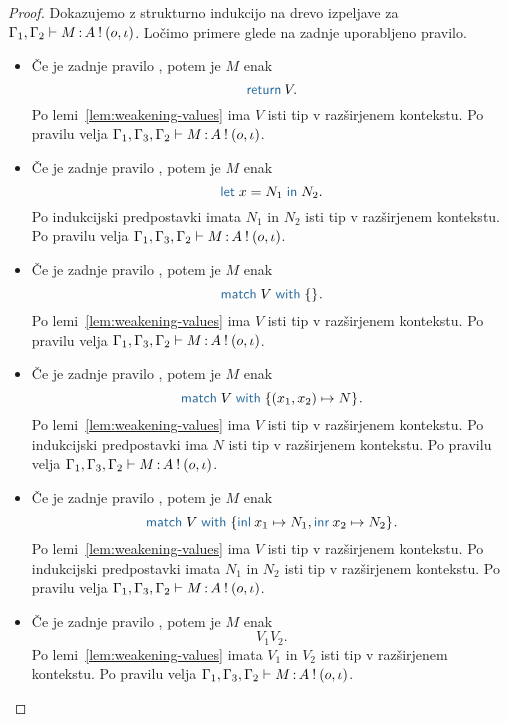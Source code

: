 \begin{proof}
	Dokazujemo z strukturno indukcijo na drevo izpeljave za $\Gamma_1, \Gamma_2 \vdash M \mathinner{:} A \mathbin{!} (o, \iota)$.
	Ločimo primere glede na zadnje uporabljeno pravilo.
	
	\begin{itemize}
		\item Če je zadnje pravilo , potem je $M$ enak $$\tmreturn{V}.$$
		Po lemi~\ref{lem:weakening-values} ima $V$ isti tip v razširjenem kontekstu.
		Po pravilu  velja $\Gamma_1, \Gamma_3, \Gamma_2 \vdash M \mathinner{:} A \mathbin{!} (o, \iota)$.
		
		\item Če je zadnje pravilo , potem je $M$ enak $$\tmlet{x}{N_1}{N_2}.$$
		Po indukcijski predpostavki imata $N_1$ in $N_2$ isti tip v razširjenem kontekstu.
		Po pravilu  velja $\Gamma_1, \Gamma_3, \Gamma_2 \vdash M \mathinner{:} A \mathbin{!} (o, \iota)$.
		
		\item Če je zadnje pravilo , potem je $M$ enak $$\tmmatch{V}{}.$$
		Po lemi~\ref{lem:weakening-values} ima $V$ isti tip v razširjenem kontekstu.
		Po pravilu  velja $\Gamma_1, \Gamma_3, \Gamma_2 \vdash M \mathinner{:} A \mathbin{!} (o, \iota)$.
		
		\item Če je zadnje pravilo , potem je $M$ enak $$\tmmatch{V}{(x_1,x_2) \mapsto N}.$$ 
		Po lemi~\ref{lem:weakening-values} ima $V$ isti tip v razširjenem kontekstu.
		Po indukcijski predpostavki ima $N$ isti tip v razširjenem kontekstu.
		Po pravilu  velja $\Gamma_1, \Gamma_3, \Gamma_2 \vdash M \mathinner{:} A \mathbin{!} (o, \iota)$.
		
		\item Če je zadnje pravilo , potem je $M$ enak $$\tmmatch{V}{\tminl{x_1} \mapsto N_1, \tminr{x_2} \mapsto N_2}.$$
		Po lemi~\ref{lem:weakening-values} ima $V$ isti tip v razširjenem kontekstu.
		Po indukcijski predpostavki imata $N_1$ in $N_2$ isti tip v razširjenem kontekstu.
		Po pravilu  velja $\Gamma_1, \Gamma_3, \Gamma_2 \vdash M \mathinner{:} A \mathbin{!} (o, \iota)$.
		
		\item Če je zadnje pravilo , potem je $M$ enak $$V_1 V_2.$$
		Po lemi~\ref{lem:weakening-values} imata $V_1$ in $V_2$ isti tip v razširjenem kontekstu.
		Po pravilu  velja $\Gamma_1, \Gamma_3, \Gamma_2 \vdash M \mathinner{:} A \mathbin{!} (o, \iota)$.
		

\end{itemize}
\end{proof}
